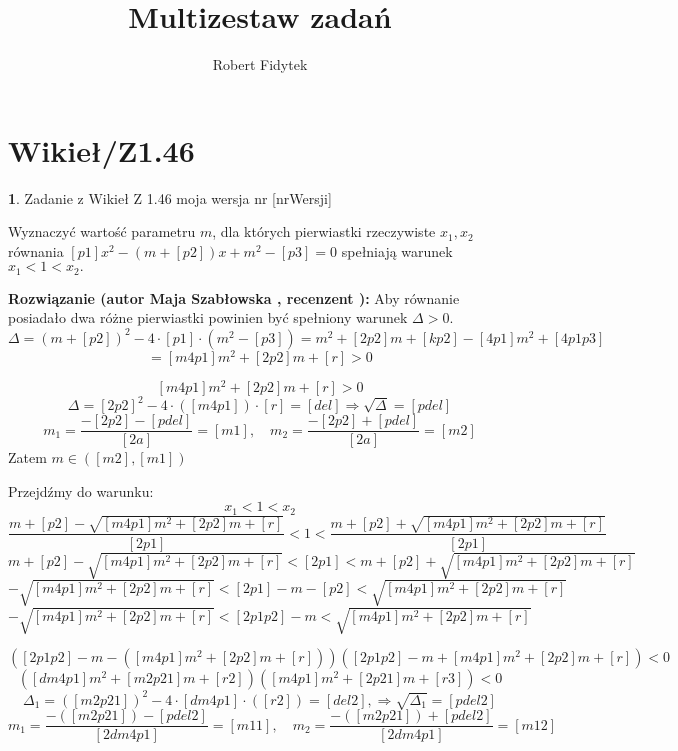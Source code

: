 \documentclass[12pt, a4paper]{article}
\title{Multizestaw zadań}
\author{Robert Fidytek}
\date{}
\theoremstyle{definition} %
\newtheorem{zad}{}
\newcommand{\kategoria}[1]{\section{#1}} %
\newcommand{\zadStart}[1]{\begin{zad}#1\newline} %
\newcommand{\zadStop}{\end{zad}}   %
\newcommand{\rozwStart}[2]{\noindent \textbf{Rozwiązanie (autor #1 , recenzent #2): }\newline} %
\begin{document}
\maketitle


\kategoria{Wikieł/Z1.46}
\zadStart{Zadanie z Wikieł Z 1.46 moja wersja nr [nrWersji]}

Wyznaczyć wartość parametru $m$, dla których pierwiastki rzeczywiste $x_{1}, x_{2}$ równania $[p1]x^{2}-(m+[p2])x+m^{2}-[p3]=0$ spełniają warunek $x_{1}<1<x_{2}.$
\zadStop

\rozwStart{Maja Szabłowska}{}
Aby równanie posiadało dwa różne pierwiastki powinien być spełniony warunek $\Delta>0.$
$$\Delta=(m+[p2])^{2}-4\cdot[p1]\cdot(m^{2}-[p3])=m^{2}+[2p2]m+[kp2]-[4p1]m^{2}+[4p1p3]$$
$$=[m4p1]m^{2}+[2p2]m+[r]>0$$

$$[m4p1]m^{2}+[2p2]m+[r]>0$$
$$\Delta=[2p2]^{2}-4\cdot([m4p1])\cdot[r]=[del] \Rightarrow \sqrt{\Delta}=[pdel]$$
$$m_{1}=\frac{-[2p2]-[pdel]}{[2a]}=[m1], \quad m_{2}=\frac{-[2p2]+[pdel]}{[2a]}=[m2]$$
Zatem $m\in([m2], [m1])$

Przejdźmy do warunku:
$$x_{1}<1<x_{2}$$
$$\frac{m+[p2]-\sqrt{[m4p1]m^{2}+[2p2]m+[r]}}{[2p1]}<1<\frac{m+[p2]+\sqrt{[m4p1]m^{2}+[2p2]m+[r]}}{[2p1]}$$
$$m+[p2]-\sqrt{[m4p1]m^{2}+[2p2]m+[r]}<[2p1]<m+[p2]+\sqrt{[m4p1]m^{2}+[2p2]m+[r]}$$
$$-\sqrt{[m4p1]m^{2}+[2p2]m+[r]}<[2p1]-m-[p2]<\sqrt{[m4p1]m^{2}+[2p2]m+[r]}$$
$$-\sqrt{[m4p1]m^{2}+[2p2]m+[r]}<[2p1p2]-m<\sqrt{[m4p1]m^{2}+[2p2]m+[r]}$$

$$([2p1p2]-m-([m4p1]m^{2}+[2p2]m+[r]))([2p1p2]-m+[m4p1]m^{2}+[2p2]m+[r])<0$$
$$([dm4p1]m^{2}+[m2p21]m+[r2])([m4p1]m^{2}+[2p21]m+[r3])<0$$
$$\Delta_{1}=([m2p21])^{2}-4\cdot[dm4p1]\cdot([r2])=[del2], \Rightarrow \sqrt{\Delta_{1}}=[pdel2]$$
$$m_{1}=\frac{-([m2p21])-[pdel2]}{[2dm4p1]}=[m11], \quad m_{2}=\frac{-([m2p21])+[pdel2]}{[2dm4p1]}=[m12]$$
\end{document}
